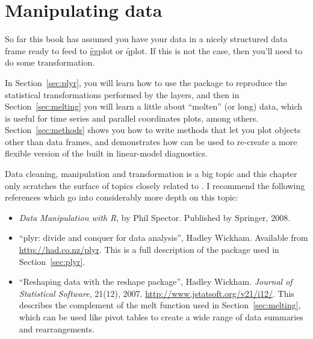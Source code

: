

% 


\chapter{Manipulating data}
\label{cha:data}

So far this book has assumed you have your data in a nicely structured data frame ready to feed to \f{ggplot} or \f{qplot}. If this is not the case, then you'll need to do some transformation.

In Section~\ref{sec:plyr}, you will learn how to use the  package to reproduce the statistical transformations performed by the layers, and then in Section~\ref{sec:melting} you will learn a little about ``molten'' (or long) data, which is useful for time series and parallel coordinates plots, among others.  Section~\ref{sec:methods} shows you how to write methods that let you plot objects other than data frames, and demonstrates how \ggplot can be used to re-create a more flexible version of the built in linear-model diagnostics.  

Data cleaning, manipulation and transformation is a big topic and this chapter only scratches the surface of topics closely related to \ggplot.  I recommend the following references which go into considerably more depth on this topic:

\begin{itemize}
  \item \emph{Data Manipulation with R}, by Phil Spector.  Published by Springer, 2008.
  
  \item ``plyr: divide and conquer for data analysis'', Hadley Wickham.  Available from \url{http://had.co.nz/plyr}.  This is a full description of the package used in Section~\ref{sec:plyr}.

  \item ``Reshaping data with the reshape package'', Hadley Wickham. \emph{Journal of Statistical Software}, 21(12), 2007. \url{http://www.jstatsoft.org/v21/i12/}.  This describes the complement of the melt function used in Section~\ref{sec:melting}, which can be used like pivot tables to create a wide range of data summaries and rearrangements.
  
\end{itemize}

